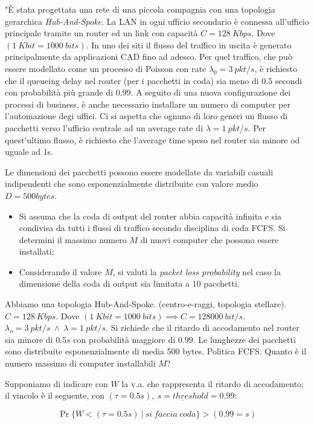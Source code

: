 "\`E stata progettata una rete di una piccola compagnia con una topologia gerarchica \textit{Hub-And-Spoke}. La LAN in ogni ufficio secondario è connessa all'ufficio principale tramite un router ed un link con capacità $C = 128\ Kbps$. Dove $(1\ Kbit = 1000\ bits)$. In uno dei siti il flusso del traffico in uscita è generato principalmente da applicazioni CAD fino ad adesso. Per quel traffico, che può essere modellato come un processo di Poisson con rate $\lambda_0 = 3\ pkt/s$, è richiesto che il queueing delay nel router (per i pacchetti in coda) sia meno di $0.5$ secondi con probabilità più grande di $0.99$. A seguito di una nuova configurazione dei processi di business, è anche necessario installare un numero di computer per l'automazione degi uffici. Ci si aspetta che ognuno di loro generi un flusso di pacchetti verso l'ufficio centrale ad un average rate di $\lambda = 1\ pkt/s$. Per quest'ultimo flusso, è richiesto che l'average time speso nel router sia minore od uguale ad 1s.

Le dimensioni dei pacchetti possono essere modellate da variabili casuali indipendenti che sono esponenzialmente distribuite con valore medio $D = 500bytes$.

\begin{itemize}
\item Si assuma che la coda di output del router abbia capacità infinita e sia condivisa da tutti i flussi di traffico secondo disciplina di coda FCFS. Si determini il massimo numero $M$ di nuovi computer che possono essere installati;
\item Considerando il valore $M$, si valuti la \textit{packet loss probability} nel caso la dimensione della coda di output sia limitata a 10 pacchetti.
\end{itemize}

Abbiamo una topologia Hub-And-Spoke. (centro-e-raggi, topologia stellare). $C = 128\ Kbps$. Dove $(1\ Kbit = 1000\ bits) \implies C = 128000\ bit/s$. $\lambda_o = 3\ pkt/s\ \land\ \lambda = 1\ pkt/s$. Si richiede che il ritardo di accodamento nel router sia minore di $0.5s$ con probabilità maggiore di $0.99$. Le lunghezze dei pacchetti sono distribuite esponenzialmente di media 500 bytes. Politica FCFS. Quanto è il numero massimo di computer installabili $M$?

Supponiamo di indicare con $W$ la v.a. che rappresenta il ritardo di accodamento; il vincolo è il seguente, con $(\tau = 0.5s),\ \underline{s=threshold}=0.99$:

\[
	\Pr\{W < (\tau = 0.5s)\ |\ si\ faccia\ coda\} > (0.99 = s)
\]

